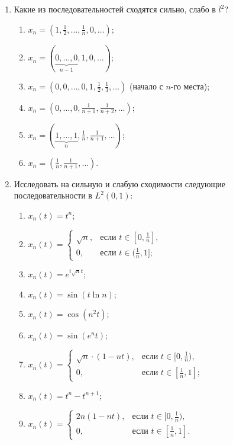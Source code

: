 \documentclass[12pt,a4paper]{article}
\begin{document}
\begin{enumerate}
\newpage

\item Какие из последовательностей сходятся сильно, слабо в $l^{2}$?
\begin{enumerate}[label=\alph*)]
\item $x_{n} = (1, \frac{1}{2}, \dots, \frac{1}{n}, 0, \dots)$;
\item $x_{n} = (\underbrace{0, \dots, 0}_{n-1}, 1, 0, \dots)$;
\item $x_{n} = (0, 0, \dots, 0, 1, \frac{1}{2}, \frac{1}{3}, \dots)$ (начало с $n$-го места);
\item $x_{n} = (0, \dots, 0, \frac{1}{n+1}, \frac{1}{n+2}, \dots)$;
\item $x_{n} = (\underbrace{1, \dots, 1}_{n}, \frac{1}{n}, \frac{1}{n+1}, \dots)$;
\item $x_{n} = (\frac{1}{n}, \frac{1}{n+1}, \dots)$.
\end{enumerate}

\item Исследовать на сильную и слабую сходимости следующие последовательности в $L^{2}(0,1)$:
\begin{enumerate}[label=\alph*)]
\item $x_{n}(t) = t^{n}$;
\item $x_{n}(t) =
\begin{cases} \sqrt{n}, & \text{если } t \in [0, \frac{1}{n}], \\ 0, & \text{если } t \in (\frac{1}{n}, 1];
\end{cases}$
\item $x_{n}(t) = e^{i\sqrt{n}t}$;
\item $x_{n}(t) = \sin(t \ln n)$;
\item $x_{n}(t) = \cos(n^{2}t)$;
\item $x_{n}(t) = \sin(e^{n}t)$;
\item $x_{n}(t) =
\begin{cases} \sqrt{n} \cdot (1 - nt), & \text{если } t \in [0, \frac{1}{n}), \\ 0, & \text{если } t \in [\frac{1}{n}, 1];
\end{cases}$
\item $x_{n}(t) = t^{n} - t^{n+1}$;
\item $x_{n}(t) =
\begin{cases} 2n(1 - nt), & \text{если } t \in [0, \frac{1}{n}), \\ 0, & \text{если } t \in [\frac{1}{n}, 1].
\end{cases}$
\end{enumerate}


\end{enumerate}
\end{document}
